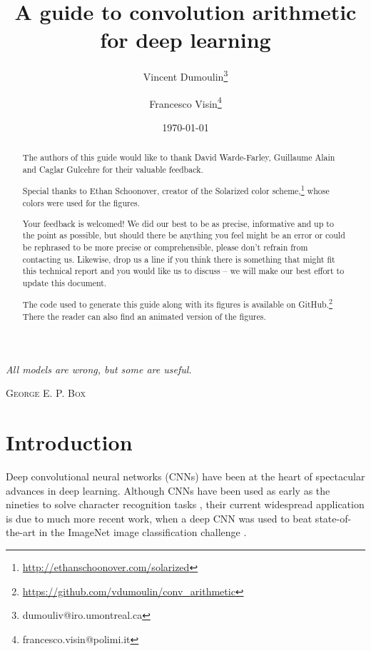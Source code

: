 \documentclass[notitlepage]{report}
\title{A guide to convolution arithmetic for deep learning}
\author[$\bigstar$]{Vincent Dumoulin\thanks{dumouliv@iro.umontreal.ca}}
\author[$\bigstar\dagger$]{Francesco Visin\thanks{francesco.visin@polimi.it}}
\affil[$\bigstar$]{MILA, Universit\'{e} de Montr\'{e}al}
\affil[$\dagger$]{AIRLab, Politecnico di Milano}
\date{\today}
\let\originalepigraph\epigraph
\renewcommand\epigraph[2]{\originalepigraph{\textit{#1}}{\textsc{#2}}}
\begin{document}
\maketitle
\thispagestyle{empty}
\clearpage

\setlength{\epigraphwidth}{0.4\textwidth}
\epigraph{All models are wrong, but some are useful.}{George E. P. Box}
\clearpage

\renewcommand{\abstractname}{Acknowledgements}
\begin{abstract}
    The authors of this guide would like to thank David Warde-Farley, Guillaume
    Alain and Caglar Gulcehre for their valuable feedback.

    Special thanks to Ethan Schoonover, creator of the Solarized color
    scheme,\footnote{\url{http://ethanschoonover.com/solarized}} whose colors
    were used for the figures.
\end{abstract}

\renewcommand{\abstractname}{Feedback}
\begin{abstract}
    Your feedback is welcomed! We did our best to be as precise, informative and
    up to the point as possible, but should there be anything you feel might be
    an error or could be rephrased to be more precise or comprehensible, please
    don't refrain from contacting us. Likewise, drop us a line if you think
    there is something that might fit this technical report and you would like
    us to discuss -- we will make our best effort to update this document.
\end{abstract}

\renewcommand{\abstractname}{Source code and animations}
\begin{abstract}
    The code used to generate this guide along with its figures is available on
    GitHub.\footnote{\url{https://github.com/vdumoulin/conv_arithmetic}} There
    the reader can also find an animated version of the figures.
\end{abstract}

\tableofcontents

\chapter{Introduction}

Deep convolutional neural networks (CNNs) have been at the heart of spectacular
advances in deep learning. Although CNNs have been used as early as the nineties
to solve character recognition tasks \citep{le1997reading}, their current
widespread application is due to much more recent work, when a deep CNN was used
to beat state-of-the-art in the ImageNet image classification challenge
\citep{krizhevsky2012imagenet}.
\end{document}
